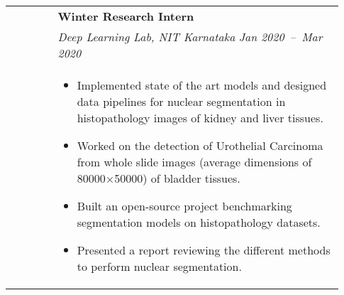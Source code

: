 \documentclass[letterpaper, 10pt, oneside]{article}
\newcommand{\bdit}[1]{{\textbf{#1}}}
\begin{document}
\begin{longtable}{@{} p{0.13\linewidth} p{0.8\linewidth}}
                         & \bdit{Winter Research Intern}                                                                                                                                                                        \\
                         & \textsl{Deep Learning Lab, NIT Karnataka} \hfill \hspace{-3em} \textsl{Jan 2020\ --\ Mar 2020}                                                                                                       \\
                         & \parbox{0.8\textwidth}{                                                                                                                                                                              %
        \begin{itemize}[leftmargin=*, itemsep=-0.88ex, topsep=-0.88ex]
            \item Implemented state of the art models and designed data pipelines for nuclear segmentation in histopathology images of kidney and liver tissues.
            \item Worked on the detection of Urothelial Carcinoma from whole slide images (average dimensions of 80000$\times$50000) of bladder tissues.
            \item Built an open-source project benchmarking segmentation models on histopathology datasets.
            \item Presented a report reviewing the different methods to perform nuclear segmentation.
        \end{itemize}
    }
    \\
    \\


\end{longtable}
\end{document}
